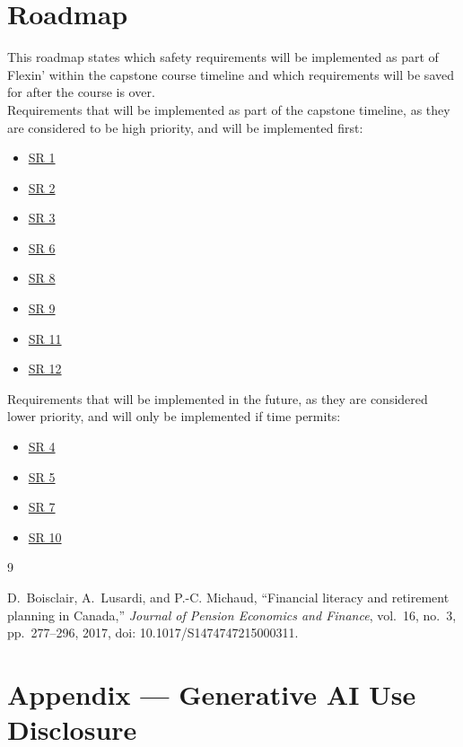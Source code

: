 \documentclass{article}
\begin{document}
\section{Roadmap}

This roadmap states which safety requirements will be implemented as part of Flexin' within the capstone course timeline and which requirements will be saved for after the course is over.\\

Requirements that will be implemented as part of the capstone timeline, as they are considered to be high priority, and will be implemented first:
\begin{itemize}
    \item \hyperlink{sr1}{SR 1}
    \item \hyperlink{sr2}{SR 2}
    \item \hyperlink{sr3}{SR 3}
    \item \hyperlink{sr6}{SR 6}
    \item \hyperlink{sr8}{SR 8}
    \item \hyperlink{sr9}{SR 9}
    \item \hyperlink{sr11}{SR 11}
    \item \hyperlink{sr12}{SR 12}
\end{itemize}

Requirements that will be implemented in the future, as they are considered lower priority, and will only be implemented if time permits:
\begin{itemize}
    \item \hyperlink{sr4}{SR 4}
    \item \hyperlink{sr5}{SR 5}
    \item \hyperlink{sr7}{SR 7}
    \item \hyperlink{sr10}{SR 10}
\end{itemize}

\begin{thebibliography}{9}

    D.~Boisclair, A.~Lusardi, and P.-C. Michaud, ``Financial literacy and
    retirement planning in Canada,'' \emph{Journal of Pension Economics and
    Finance}, vol.~16, no.~3, pp.~277--296, 2017,
    doi: 10.1017/S1474747215000311.

\end{thebibliography}

\newpage{}

\section{Appendix --- Generative AI Use Disclosure}
\end{document}
